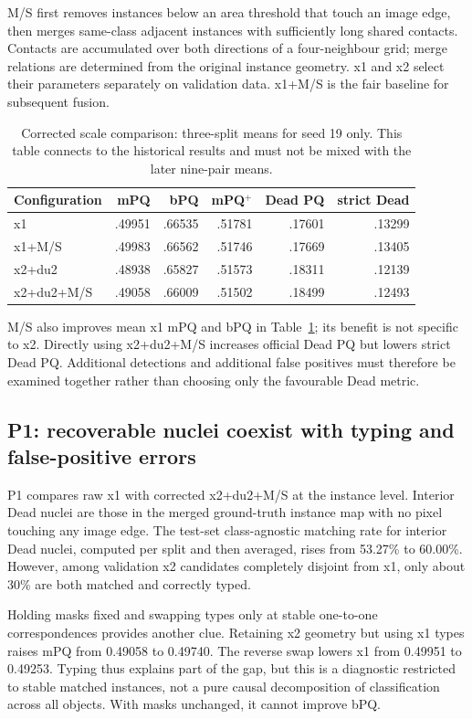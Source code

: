 \documentclass[11pt,a4paper]{article}
\begin{document}
M/S first removes instances below an area threshold that touch an image edge, then merges same-class adjacent instances with sufficiently long shared contacts. Contacts are accumulated over both directions of a four-neighbour grid; merge relations are determined from the original instance geometry. x1 and x2 select their parameters separately on validation data. x1+M/S is the fair baseline for subsequent fusion.

\begin{table}[H]
\centering\small
\caption{Corrected scale comparison: three-split means for seed 19 only. This table connects to the historical results and must not be mixed with the later nine-pair means.}
\label{tab:p0}
\begin{tabular}{lrrrrr}\toprule
Configuration & mPQ & bPQ & mPQ$^+$ & Dead PQ & strict Dead\\\midrule
x1 & .49951 & .66535 & .51781 & .17601 & .13299\\
x1+M/S & .49983 & .66562 & .51746 & .17669 & .13405\\
x2+du2 & .48938 & .65827 & .51573 & .18311 & .12139\\
x2+du2+M/S & .49058 & .66009 & .51502 & .18499 & .12493\\\bottomrule
\end{tabular}
\end{table}

M/S also improves mean x1 mPQ and bPQ in Table~\ref{tab:p0}; its benefit is not specific to x2. Directly using x2+du2+M/S increases official Dead PQ but lowers strict Dead PQ. Additional detections and additional false positives must therefore be examined together rather than choosing only the favourable Dead metric.

\subsection{P1: recoverable nuclei coexist with typing and false-positive errors}

P1 compares raw x1 with corrected x2+du2+M/S at the instance level. Interior Dead nuclei are those in the merged ground-truth instance map with no pixel touching any image edge. The test-set class-agnostic matching rate for interior Dead nuclei, computed per split and then averaged, rises from 53.27\% to 60.00\%. However, among validation x2 candidates completely disjoint from x1, only about 30\% are both matched and correctly typed.

Holding masks fixed and swapping types only at stable one-to-one correspondences provides another clue. Retaining x2 geometry but using x1 types raises mPQ from 0.49058 to 0.49740. The reverse swap lowers x1 from 0.49951 to 0.49253. Typing thus explains part of the gap, but this is a diagnostic restricted to stable matched instances, not a pure causal decomposition of classification across all objects. With masks unchanged, it cannot improve bPQ.
\end{document}
